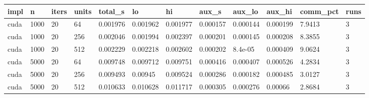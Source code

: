\begin{tabular}{llllllllllll}
\hline
impl & n & iters & units & total\_s & lo & hi & aux\_s & aux\_lo & aux\_hi & comm\_pct & runs \\
\hline
cuda & 1000 & 20 & 64 & 0.001976 & 0.001962 & 0.001977 & 0.000157 & 0.000144 & 0.000199 & 7.9413 & 3 \\
cuda & 1000 & 20 & 256 & 0.002046 & 0.001994 & 0.002397 & 0.000201 & 0.000145 & 0.000208 & 8.3855 & 3 \\
cuda & 1000 & 20 & 512 & 0.002229 & 0.002218 & 0.002602 & 0.000202 & 8.4e-05 & 0.000409 & 9.0624 & 3 \\
cuda & 5000 & 20 & 64 & 0.009748 & 0.009712 & 0.009751 & 0.000416 & 0.000407 & 0.000526 & 4.2834 & 3 \\
cuda & 5000 & 20 & 256 & 0.009493 & 0.00945 & 0.009524 & 0.000286 & 0.000182 & 0.000485 & 3.0127 & 3 \\
cuda & 5000 & 20 & 512 & 0.010633 & 0.010628 & 0.011717 & 0.000305 & 0.000276 & 0.00066 & 2.8684 & 3 \\
\hline
\end{tabular}

